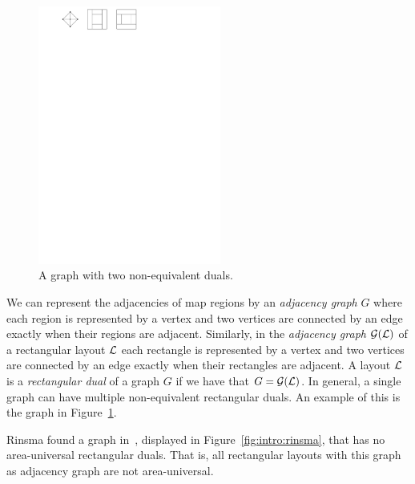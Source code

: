   \begin{figure}
    \centering
    \includegraphics[width=6cm]{introduction/img/nonuniqueRectDual.pdf}
    \caption{A graph with two non-equivalent duals.}
    \label{fig:intro:nonuniqueRectDual}
  \end{figure}

  We can represent the adjacencies of map regions by an \emph{adjacency graph} $G$ where each region is represented by a vertex and two vertices are connected by an edge exactly when their regions are adjacent.
  Similarly, in the \emph{adjacency graph} $\mathcal{G}(\mathcal{L})$ of a rectangular layout $\mathcal{L}$ each rectangle is represented by a vertex and two vertices are connected by an edge exactly when their rectangles are adjacent.
  A layout $\mathcal{L}$ is a \emph{rectangular dual} of a graph $G$ if we have that $G = \mathcal{G}(\mathcal{L})$.
  In general, a single graph can have multiple non-equivalent rectangular duals. An example of this is the graph in Figure~\ref{fig:intro:nonuniqueRectDual}.

  Rinsma found a graph in~\cite{Rinsma1987}, displayed in Figure~\ref{fig:intro:rinsma}, that has no area-universal rectangular duals.
  That is, all rectangular layouts with this graph as adjacency graph are not area-universal.


